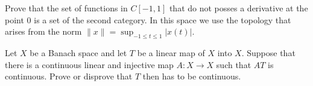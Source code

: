 \begin{alist}
\item Prove that the set of functions in $C[-1,1]$ that do not posses a
derivative at the point $0$ is a set of the second category. In this
space we use the topology that arises from the norm
$\|x\|=\sup_{-1\leq t\leq 1}|x(t)|$.
\item Let $X$ be a Banach space and let $T$ be a linear map of $X$
into $X$. Suppose that there is a continuous linear and injective map
$A:X\rightarrow X$ such that $AT$ is continuous. Prove or disprove
that $T$ then has to be continuous.
\end{alist}
